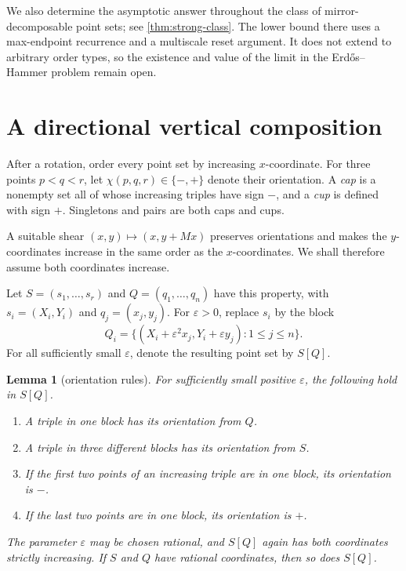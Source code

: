 \documentclass[11pt]{article}
\newtheorem{lemma}[theorem]{Lemma}
\theoremstyle{remark}
\begin{document}
We also determine the asymptotic answer throughout the class of
mirror-decomposable point sets; see \cref{thm:strong-class}.
The lower bound there uses a max-endpoint recurrence and a multiscale reset
argument.  It does not extend to arbitrary order types, so the existence
and value of the limit in the Erd\H{o}s--Hammer problem remain open.

\section{A directional vertical composition}

After a rotation, order every point set by increasing $x$-coordinate.  For
three points $p<q<r$, let $\chi(p,q,r)\in\{-,+\}$ denote their orientation.
A \emph{cap} is a nonempty set all of whose increasing triples have sign
$-$, and a \emph{cup} is defined with sign $+$.  Singletons and pairs are
both caps and cups.

A suitable shear $(x,y)\mapsto(x,y+Mx)$ preserves orientations
and makes the $y$-coordinates increase in the same order as the
$x$-coordinates.  We shall therefore assume both coordinates increase.

Let $S=(s_1,\ldots,s_r)$ and $Q=(q_1,\ldots,q_n)$ have this property, with
$s_i=(X_i,Y_i)$ and $q_j=(x_j,y_j)$.  For $\varepsilon>0$, replace $s_i$ by
the block
\[
 Q_i=\bigl\{(X_i+\varepsilon^2x_j,
              Y_i+\varepsilon y_j):1\le j\le n\bigr\}.       \tag{2.1}
\]
For all sufficiently small $\varepsilon$, denote the resulting point set
by $S[Q]$.

\begin{lemma}[orientation rules]\label{lem:orientation}
For sufficiently small positive $\varepsilon$, the following hold in
$S[Q]$.
\begin{enumerate}
\item A triple in one block has its orientation from $Q$.
\item A triple in three different blocks has its orientation from $S$.
\item If the first two points of an increasing triple are in one block,
      its orientation is $-$.
\item If the last two points are in one block, its orientation is $+$.
\end{enumerate}
The parameter $\varepsilon$ may be chosen rational, and $S[Q]$ again has
both coordinates strictly increasing.  If $S$ and $Q$ have rational
coordinates, then so does $S[Q]$.
\end{lemma}
\end{document}
